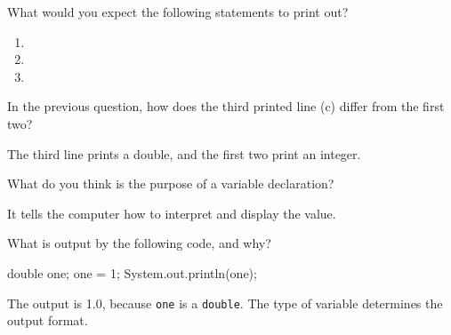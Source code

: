 \Q What would you expect the following statements to print out?

\begin{enumerate}
\item {} 
\item {} 
\item {} 
\end{enumerate}


\Q In the previous question, how does the third printed line (c) differ from the first two?

\begin{answer}
The third line prints a double, and the first two print an integer.
\end{answer}


\Q What do you think is the purpose of a variable declaration?

\begin{answer}
It tells the computer how to interpret and display the value.
\end{answer}


\Q What is output by the following code, and why?

\begin{minipage}[t]{0.33\linewidth}

\vspace{-2ex}
\begin{javalst}
double one;
one = 1;
System.out.println(one);
\end{javalst}

\end{minipage}
\hfill
\begin{minipage}[t]{0.66\linewidth}

\begin{answer}
The output is 1.0, because {\tt one} is a {\tt double}.
The type of variable determines the output format.
\end{answer}

\end{minipage}
